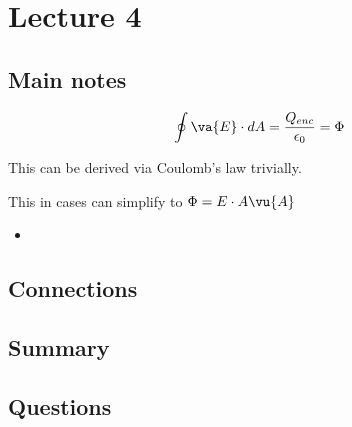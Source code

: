 \section{Lecture 4}

\subsection{Main notes}
\[
\oint \va{E} \cdot dA = \frac{Q_{enc}}{\epsilon_0} = \Phi
  \]

  This can be derived via Coulomb's law trivially.

  This in cases can simplify to $\Phi = E \cdot A \vu{A}$

\begin{itemize}
	\item
\end{itemize}


\subsection{Connections}


\subsection{Summary}


\subsection{Questions}
